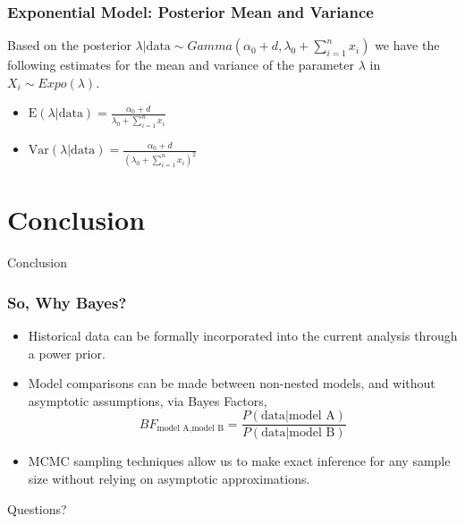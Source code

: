\documentclass{beamer}
\begin{document}
\begin{frame}
\frametitle{Exponential Model: Posterior Mean and Variance}
Based on the posterior $\lambda|\text{data} \sim Gamma(\alpha_0 + d, \lambda_0 + \sum_{i=1}^{n}x_i)$ we have the following estimates for the mean and variance of the parameter $\lambda$ in $X_i \sim Expo(\lambda)$. 
\bigskip
\begin{itemize}
\item $\text{E}(\lambda|\text{data}) = \frac{\alpha_0 + d}{\lambda_0 + \sum_{i=1}^n x_i}$
\bigskip
\item $\text{Var}(\lambda|\text{data}) = \frac{\alpha_0 + d}{(\lambda_0 + \sum_{i=1}^n x_i)^2}$
\end{itemize} 
\end{frame}

\section{Conclusion}

\begin{frame}[c]
\begin{center}
\huge
Conclusion 
\end{center}
\end{frame}

\begin{frame}
\frametitle{So, Why Bayes?}
\begin{itemize}
\item Historical data can be formally incorporated into the current analysis through a \color{orange} power prior\color{black}.
\item Model comparisons can be made between non-nested models, and without asymptotic assumptions, via \color{orange} Bayes Factors\color{black},
$$BF_{\text{model A}, \text{model B}} = \frac{P(\text{data}|\text{model A})}{P(\text{data}|\text{model B})}$$ 
\item MCMC sampling techniques allow us to make exact inference for \color{orange}any sample size \color{black}without relying on asymptotic approximations. 
\end{itemize}
\end{frame}

\begin{frame}[c]
\begin{center}
\Huge
Questions? 
\end{center}
\end{frame}
\end{document}
